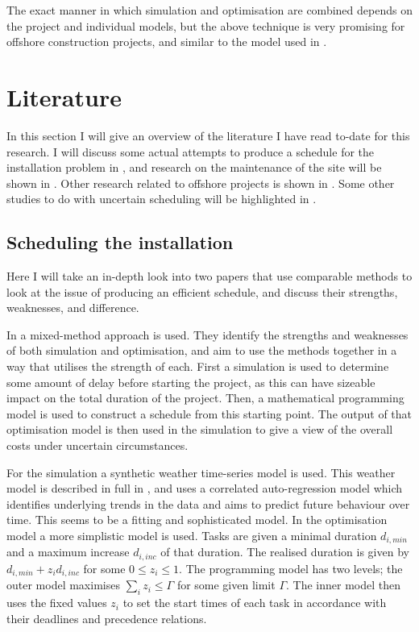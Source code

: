\documentclass[a4paper,12pt]{article}
\begin{document}
The exact manner in which simulation and optimisation are combined depends on the project and individual models, but the above technique is very promising for offshore construction projects, and similar to the model used in \cite{kerkhove2017optimised}. 

\pagebreak

\section{Literature} \label{s:lit}
In this section I will give an overview of the literature I have read to-date for this research. I will discuss some actual attempts to produce a schedule for the installation problem in , and research on the maintenance of the site will be shown in . Other research related to offshore projects is shown in . Some other studies to do with uncertain scheduling will be highlighted in .  

\subsection{Scheduling the installation} \label{ss:sched}
Here I will take an in-depth look into two papers that use comparable methods to look at the issue of producing an efficient schedule, and discuss their strengths, weaknesses, and difference.

\bigskip

In \cite{barlow2018mixed} a mixed-method approach is used. They identify the strengths and weaknesses of both simulation and optimisation, and aim to use the methods together in a way that utilises the strength of each. First a simulation is used to determine some amount of delay before starting the project, as this can have sizeable impact on the total duration of the project. Then, a mathematical programming model is used to construct a schedule from this starting point. The output of that optimisation model is then used in the simulation to give a view of the overall costs under uncertain circumstances. 

For the simulation a synthetic weather time-series model is used. This weather model is described in full in \cite{dinwoodie2014operational} , and uses a correlated auto-regression model which identifies underlying trends in the data and aims to predict future behaviour over time. This seems to be a fitting and sophisticated model. In the optimisation model a more simplistic model is used. Tasks are given a minimal duration $d_{i, min}$ and a maximum increase $d_{i, inc}$ of that duration. The realised duration is given by $d_{i,  min} + z_i d_{i, inc}$ for some $0 \leq z_i \leq 1$. The programming model has two levels; the outer model maximises $\sum_i z_i \leq \Gamma$ for some given limit $\Gamma$. The inner model then uses the fixed values $z_i$ to set the start times of each task in accordance with their deadlines and precedence relations. 
\end{document}
